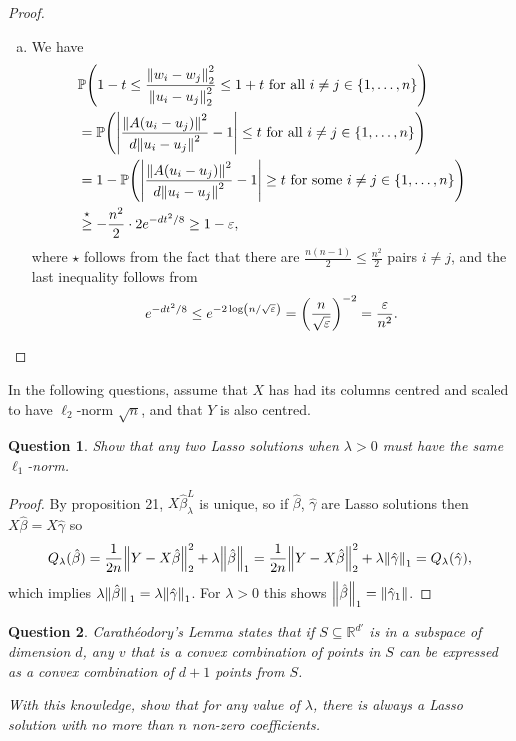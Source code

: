 \documentclass{article}
\theoremstyle{plain}
\newtheorem{question}{Question}
\theoremstyle{remark}
\renewcommand{\epsilon}{\varepsilon}
\newcommand{\Bb}{\mathbb}
\newcommand{\PP}{\Bb P}
\newcommand{\RR}{\Bb R}
\newcommand\eps\epsilon
\begin{document}
\begin{proof}
\begin{enumerate}[(a)]
	\item We have
	\begin{align*}
			&\PP\qty(1 - t \leq \frac{\norm{w_i - w_j}_2^2}{\norm{u_i - u_j}_2^2} \leq 1 + t \text{ for all } i \neq j \in \qty{1, \dotsc, n})  \\
			&= \PP\qty(\abs{\frac{\norm{A (u_i - u_j)}^2}{d \norm{u_i - u_j}^2} - 1} \leq t \text{ for all } i \neq j \in \qty{1, \dotsc, n}) \\
			&= 1 - \PP\qty(\abs{\frac{\norm{A (u_i - u_j)}^2}{d \norm{u_i - u_j}^2} - 1} \geq t \text{ for some } i \neq j \in \qty{1, \dotsc, n}) \\
			&\overset\star\geq - \frac{n^2}{2} \cdot 2e^{-dt^2/8} \geq 1 - \eps, 
	\end{align*}
where $\star$ follows from the fact that there are $\frac{n(n-1)}{2} \leq \frac{n^2}{2}$ pairs $i \neq j$, and the last inequality follows from 
\[
e^{-dt^2/8} \leq e^{-2 \log(n/\sqrt\eps)} = \qty(\frac{n}{\sqrt\eps})^{-2} = \frac\eps{n^2}. 
\]
	\end{enumerate}
\end{proof}

\begin{mdframed}
	In the following questions, assume that $X$ has had its columns centred and scaled to have $\ell_2$-norm $\sqrt n$, and that $Y$ is also centred.
\end{mdframed}

\begin{question}
	Show that any two Lasso solutions when $\lambda > 0$ must have the same $\ell_1$-norm. 
\end{question}

\begin{proof}
	By proposition 21, $X\hat\beta_\lambda^L$ is unique, so if $\hat\beta$, $\hat\gamma$ are Lasso solutions then $X\hat\beta = X\hat\gamma$ so 
	\[
	Q_\lambda(\hat\beta) = \frac1{2n} \norm{Y - X\hat\beta}_2^2 + \lambda \norm{\hat\beta}_1 = \frac1{2n} \norm{Y - X\hat\beta}_2^2 + \lambda \norm{\hat\gamma}_1 = Q_\lambda(\hat\gamma), 
	\]
	which implies $\lambda \norm*{\hat\beta}_1 = \lambda \norm{\hat\gamma}_1$. For $\lambda > 0$ this shows $\norm{\hat\beta}_1 = \norm{\hat\gamma_1}$. 
\end{proof}

\begin{question}
	Carath\'eodory's Lemma states that if $S \subseteq \RR^{d'}$ is in a subspace of dimension $d$, any $v$ that is a convex combination of points in $S$ can be expressed as a convex combination of $d+1$ points from $S$. 
	
	With this knowledge, show that for any value of $\lambda$, there is always a Lasso solution with no more than $n$ non-zero coefficients. 
\end{question}
\end{document}
